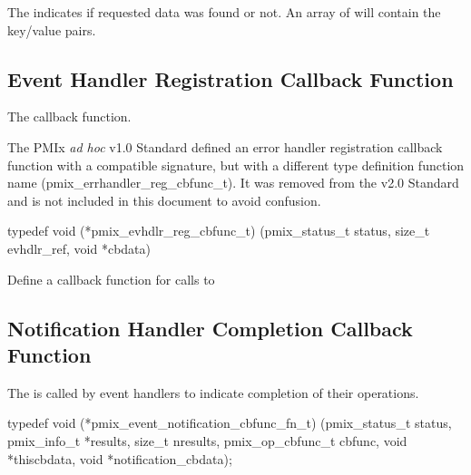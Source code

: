 \descr

The  indicates if requested data was found or not.
An array of  will contain the key/value pairs.


\subsection{Event Handler Registration Callback Function}

The  callback function.

\adviceuserstart
The \ac{PMIx} \textit{ad hoc} v1.0 Standard defined an error handler registration callback function with a compatible signature, but with a different type definition function name (pmix_errhandler_reg_cbfunc_t). It was removed from the v2.0 Standard and is not included in this document to avoid confusion.
\adviceuserend

\cspecificstart
\begin{codepar}
typedef void (*pmix_evhdlr_reg_cbfunc_t)
    (pmix_status_t status,
     size_t evhdlr_ref,
     void *cbdata)
\end{codepar}
\cspecificend

\begin{arglist}
\end{arglist}


\descr

Define a callback function for calls to 


\subsection{Notification Handler Completion Callback Function}

\summary

The  is called by event handlers to indicate completion of their operations.

\cspecificstart
\begin{codepar}
typedef void (*pmix_event_notification_cbfunc_fn_t)
    (pmix_status_t status,
     pmix_info_t *results, size_t nresults,
     pmix_op_cbfunc_t cbfunc, void *thiscbdata,
     void *notification_cbdata);
\end{codepar}
\cspecificend

